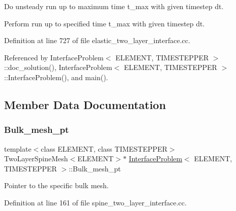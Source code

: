 Do unsteady run up to maximum time t\+\_\+max with given timestep dt. 

Perform run up to specified time t\+\_\+max with given timestep dt. 

Definition at line 727 of file elastic\+\_\+two\+\_\+layer\+\_\+interface.\+cc.



Referenced by Interface\+Problem$<$ E\+L\+E\+M\+E\+N\+T, T\+I\+M\+E\+S\+T\+E\+P\+P\+E\+R $>$\+::doc\+\_\+solution(), Interface\+Problem$<$ E\+L\+E\+M\+E\+N\+T, T\+I\+M\+E\+S\+T\+E\+P\+P\+E\+R $>$\+::\+Interface\+Problem(), and main().



\subsection{Member Data Documentation}
\mbox{\label{classInterfaceProblem_a1e9cf118e6c477ea9a1a49610bb72174}} 
\subsubsection{\texorpdfstring{Bulk\+\_\+mesh\+\_\+pt}{Bulk\_mesh\_pt}\hspace{0.1cm}{\footnotesize\ttfamily [1/2]}}
{\footnotesize\ttfamily template$<$class E\+L\+E\+M\+E\+NT, class T\+I\+M\+E\+S\+T\+E\+P\+P\+ER$>$ \\
Two\+Layer\+Spine\+Mesh$<$E\+L\+E\+M\+E\+NT$>$$\ast$ \hyperlink{classInterfaceProblem}{Interface\+Problem}$<$ E\+L\+E\+M\+E\+NT, T\+I\+M\+E\+S\+T\+E\+P\+P\+ER $>$\+::Bulk\+\_\+mesh\+\_\+pt\hspace{0.3cm}{\ttfamily [private]}}



Pointer to the specific bulk mesh. 



Definition at line 161 of file spine\+\_\+two\+\_\+layer\+\_\+interface.\+cc.

\mbox{\label{classInterfaceProblem_ad7cdca485f230393096667bf0709ef8d}} 
